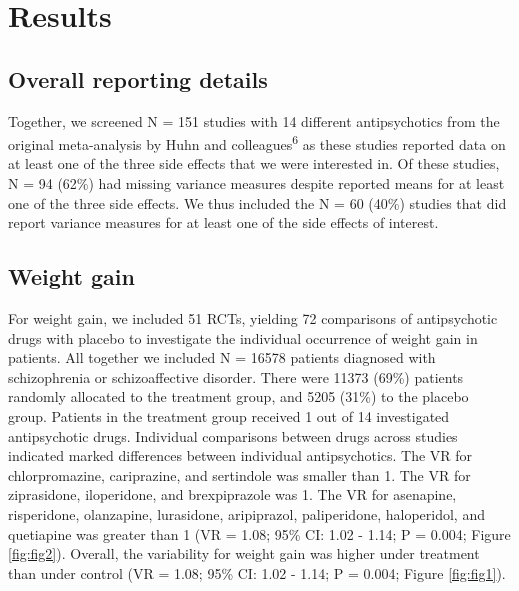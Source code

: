 \documentclass[
  9pt,
  english,
  ,jou,floatsintext]{apa6}
\begin{document}
\hypertarget{results}{%
\section{Results}\label{results}}

\hypertarget{overall-reporting-details}{%
\subsection{Overall reporting details}\label{overall-reporting-details}}

Together, we screened N = 151 studies with 14 different
antipsychotics from the original meta-analysis by Huhn and
colleagues\textsuperscript{6} as these studies reported data on at least
one of the three side effects that we were interested in. Of these studies,
N = 94
(62\%)
had missing variance measures despite reported means for at least
one of the three side effects. We thus included the N = 60
(40\%) studies that did
report variance measures for at least one of the side effects of interest.

\hypertarget{weight-gain}{%
\subsection{Weight gain}\label{weight-gain}}

For weight gain, we included 51 RCTs, yielding 72
comparisons of antipsychotic drugs with placebo to investigate the individual
occurrence of weight gain in patients. All together we included
N = 16578 patients diagnosed with schizophrenia or schizoaffective
disorder. There were 11373 (69\%)
patients randomly allocated to the treatment group, and
5205 (31\%) to the placebo
group. Patients in the treatment group received 1 out of 14
investigated antipsychotic drugs. Individual comparisons between
drugs across studies indicated marked differences between individual
antipsychotics. The VR for chlorpromazine, cariprazine, and sertindole was
smaller than 1. The VR for ziprasidone, iloperidone, and brexpiprazole
was 1. The VR for asenapine, risperidone, olanzapine, lurasidone,
aripiprazol, paliperidone, haloperidol, and quetiapine was greater than 1
(VR = 1.08; 95\% CI: 1.02 - 1.14; P = 0.004; Figure \ref{fig:fig2}). Overall, the
variability for weight gain was higher under treatment than
under control (VR = 1.08; 95\% CI: 1.02 - 1.14; P = 0.004; Figure \ref{fig:fig1}).
\end{document}
